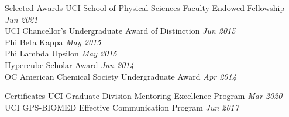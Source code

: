 \documentclass{resume} %
\begin{document}
\begin{rSection}{Selected Awards}
  UCI School of Physical Sciences Faculty Endowed Fellowship \hfill {\em Jun 2021} \\
  UCI Chancellor's Undergraduate Award of Distinction \hfill {\em Jun 2015} \\
  Phi Beta Kappa \hfill {\em May 2015} \\
  Phi Lambda Upsilon \hfill {\em May 2015} \\
  Hypercube Scholar Award \hfill {\em Jun 2014} \\
  OC American Chemical Society Undergraduate Award \hfill {\em Apr 2014}
\end{rSection}

\begin{rSection}{Certificates}
  UCI Graduate Division Mentoring Excellence Program \hfill {\em Mar 2020} \\
  UCI GPS-BIOMED Effective Communication Program \hfill {\em Jun 2017}
\end{rSection}
\end{document}
